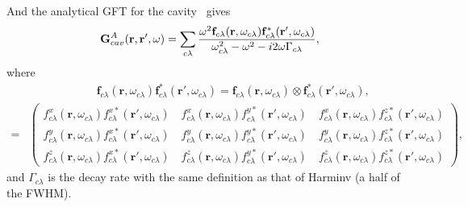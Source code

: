 And the analytical GFT for the cavity~\cite{Sakoda2005} gives
\begin{equation}
 \mathbf{G}^{A}_{cav}(\mathbf{r},\mathbf{r}',\omega)=\sum_{c\lambda}{\frac{\omega^2\mathbf{f}_{c\lambda}(\mathbf{r},\omega_{c\lambda})\mathbf{f}_{c\lambda}^*(\mathbf{r}',\omega_{c\lambda})}
{\omega_{c\lambda}^2-\omega^2-i2\omega\Gamma_{c\lambda}}},
\label{Ganal}
\end{equation}
where
\begin{align}
  {}& \quad \quad \quad \quad \quad \quad \mathbf{f}_{c\lambda}(\mathbf{r},\omega_{c\lambda})\mathbf{f}_{c\lambda}^*(\mathbf{r}',\omega_{c\lambda})
= \mathbf{f}_{c\lambda}(\mathbf{r},\omega_{c\lambda}) \otimes \mathbf{f}_{c\lambda}^*(\mathbf{r}',\omega_{c\lambda}),\\
=& \! \left( \! \begin{array}{c}
               f_{c\lambda}^x(\mathbf{r},\omega_{c\lambda})f_{c\lambda}^{x*}(\mathbf{r}',\omega_{c\lambda}) \quad
                 f_{c\lambda}^x(\mathbf{r},\omega_{c\lambda})f_{c\lambda}^{y*}(\mathbf{r}',\omega_{c\lambda}) \quad
                 f_{c\lambda}^x(\mathbf{r},\omega_{c\lambda})f_{c\lambda}^{z*}(\mathbf{r}',\omega_{c\lambda}) \\
               f_{c\lambda}^y(\mathbf{r},\omega_{c\lambda}){f}_{c\lambda}^{x*}(\mathbf{r}',\omega_{c\lambda}) \quad
                 f_{c\lambda}^y(\mathbf{r},\omega_{c\lambda}){f}_{c\lambda}^{y*}(\mathbf{r}',\omega_{c\lambda}) \quad
                 f_{c\lambda}^y(\mathbf{r},\omega_{c\lambda}){f}_{c\lambda}^{z*}(\mathbf{r}',\omega_{c\lambda}) \\
               f_{c\lambda}^z(\mathbf{r},\omega_{c\lambda}){f}_{c\lambda}^{x*}(\mathbf{r}',\omega_{c\lambda}) \quad
                 f_{c\lambda}^z(\mathbf{r},\omega_{c\lambda}){f}_{c\lambda}^{y*}(\mathbf{r}',\omega_{c\lambda}) \quad
                 f_{c\lambda}^z(\mathbf{r},\omega_{c\lambda}){f}_{c\lambda}^{z*}(\mathbf{r}',\omega_{c\lambda})
              \end{array} \! \right) \! \label{fmatrix},
\end{align}
and $\Gamma_{c\lambda}$ is the decay rate with the same definition as that of Harminv (a half of the FWHM).


